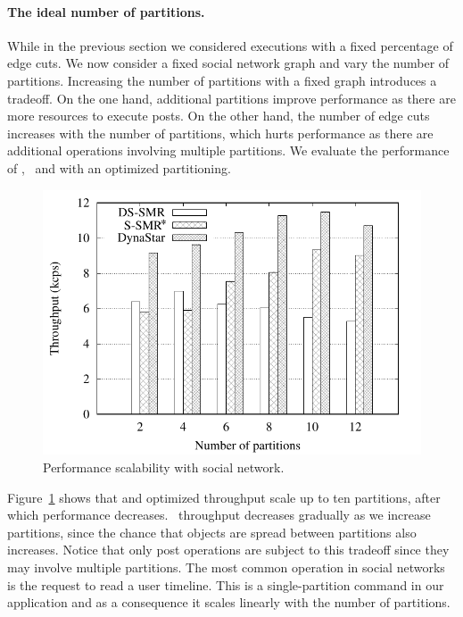 \paragraph*{The ideal number of partitions.}
\label{sec:evaluation:results}

While in the previous section we considered executions with a fixed percentage of edge cuts.
We now consider a fixed social network graph and vary the number of partitions.
Increasing the number of partitions with a fixed graph introduces a tradeoff.
On the one hand, additional partitions improve performance as there are more resources to execute posts.
On the other hand, the number of edge cuts increases with the number of partitions, which hurts performance as there are additional operations involving multiple partitions.
We evaluate the performance of \dynastar, \dssmr\ and \ssmr with an optimized partitioning.%

\begin{figure}[ht]
	\includegraphics[width=0.95\columnwidth]{figures/experiments/social-network-ideal-partition/social-network-ideal-partition}
	\caption{Performance scalability with social network.}
	\label{fig:4p1p_varying_partition_size}
\end{figure}

Figure~\ref{fig:4p1p_varying_partition_size} shows that \dynastar and optimized \ssmr throughput scale up to ten partitions, after which performance decreases. \dssmr\ throughput decreases gradually as we increase partitions, since the chance that objects are spread between partitions also increases.
Notice that only post operations are subject to this tradeoff since they may involve multiple partitions.
The most common operation in social networks is the request to read a user timeline. This is a single-partition
command in our application and as a consequence it scales linearly with the number of partitions.


